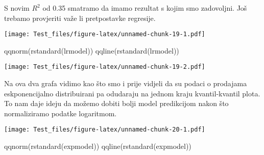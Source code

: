 \documentclass[
]{article}
\newenvironment{Shaded}{\begin{snugshade}}{\end{snugshade}}
\newcommand{\FunctionTok}[1]{\textcolor[rgb]{0.00,0.00,0.00}{#1}}
\newcommand{\NormalTok}[1]{#1}
\newcommand{\OtherTok}[1]{\textcolor[rgb]{0.56,0.35,0.01}{#1}}
\newcommand{\SpecialCharTok}[1]{\textcolor[rgb]{0.00,0.00,0.00}{#1}}
\begin{document}
S novim \(R^2\) od 0.35 smatramo da imamo rezultat s kojim smo
zadovoljni. Još trebamo provjeriti važe li pretpostavke regresije.

\begin{Shaded}
\end{Shaded}

\texttt{[image: Test\_files/figure-latex/unnamed-chunk-19-1.pdf]}

\begin{Shaded}
\begin{Highlighting}[]
\FunctionTok{qqnorm}\NormalTok{(}\FunctionTok{rstandard}\NormalTok{(lrmodel))}
\FunctionTok{qqline}\NormalTok{(}\FunctionTok{rstandard}\NormalTok{(lrmodel))}
\end{Highlighting}
\end{Shaded}

\texttt{[image: Test\_files/figure-latex/unnamed-chunk-19-2.pdf]}

Na ova dva grafa vidimo kao što smo i prije vidjeli da su podaci o
prodajama eskponencijalno distribuirani pa odudaraju na jednom kraju
kvantil-kvantil plota. To nam daje ideju da možemo dobiti bolji model
predikcijom nakon što normaliziramo podatke logaritmom.

\begin{Shaded}
\end{Shaded}

\texttt{[image: Test\_files/figure-latex/unnamed-chunk-20-1.pdf]}

\begin{Shaded}
\begin{Highlighting}[]
\FunctionTok{qqnorm}\NormalTok{(}\FunctionTok{rstandard}\NormalTok{(expmodel))}
\FunctionTok{qqline}\NormalTok{(}\FunctionTok{rstandard}\NormalTok{(expmodel))}
\end{Highlighting}
\end{Shaded}
\end{document}

